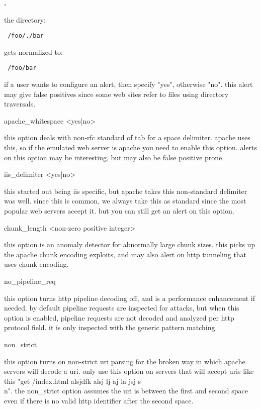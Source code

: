 \documentclass[english]{report}
\newcounter{slistnum}
\newenvironment{slist}{
    \begin{list}{
        {
            \bf \arabic{slistnum}.
        } 
    }{
        \usecounter{slistnum} 
    }
}{
    \end{list} 
}
\begin{document}
\begin{slist}
the directory:
\begin{verbatim} /foo/./bar \end{verbatim}
gets normalized to:
\begin{verbatim} /foo/bar \end{verbatim}

if a user wants to configure an alert, then specify "yes", otherwise "no".
this alert may give false positives since some web sites refer to files using
directory traversals.

\item apache\_whitespace <yes|no>

this option deals with non-rfc standard of tab for a space delimiter.  apache
uses this, so if the emulated web server is apache you need to enable this
option.  alerts on this option may be interesting, but may also be false
positive prone.

\item iis\_delimiter <yes|no>

this started out being iis specific, but apache takes this non-standard
delimiter was well.  since this is common, we always take this as standard
since the most popular web servers accept it.  but you can still get an alert
on this option.

\item chunk\_length <non-zero positive integer>

this option is an anomaly detector for abnormally large chunk sizes.  this
picks up the apache chunk encoding exploits, and may also alert on http
tunneling that uses chunk encoding.

\item no\_pipeline\_req

this option turns http pipeline decoding off, and is a performance enhancement
if needed.  by default pipeline requests are inspected for attacks, but when
this option is enabled, pipeline requests are not decoded and analyzed per
http protocol field.  it is only inspected with the generic pattern
matching.

\item non\_strict

this option turns on non-strict uri parsing for the broken way in which apache
servers will decode a uri.  only use this option on servers that will accept
uris like this "get /index.html alsjdfk alsj lj aj  la jsj s\\n".  the
non\_strict option assumes the uri is between the first and second space even if
there is no valid http identifier after the second space.


\end{slist}
\end{document}
